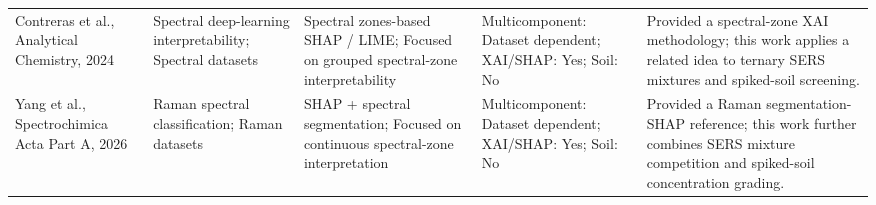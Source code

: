 {\begin{longtable}{L{2.55cm}L{3.0cm}L{3.4cm}L{2.45cm}L{4.05cm}}
Contreras et al., Analytical Chemistry, 2024 & Spectral deep-learning interpretability; Spectral datasets & Spectral zones-based SHAP / LIME; Focused on grouped spectral-zone interpretability & Multicomponent: Dataset dependent; XAI/SHAP: Yes; Soil: No & Provided a spectral-zone XAI methodology; this work applies a related idea to ternary SERS mixtures and spiked-soil screening. \\
Yang et al., Spectrochimica Acta Part A, 2026 & Raman spectral classification; Raman datasets & SHAP + spectral segmentation; Focused on continuous spectral-zone interpretation & Multicomponent: Dataset dependent; XAI/SHAP: Yes; Soil: No & Provided a Raman segmentation-SHAP reference; this work further combines SERS mixture competition and spiked-soil concentration grading. \\
\end{longtable}
}
